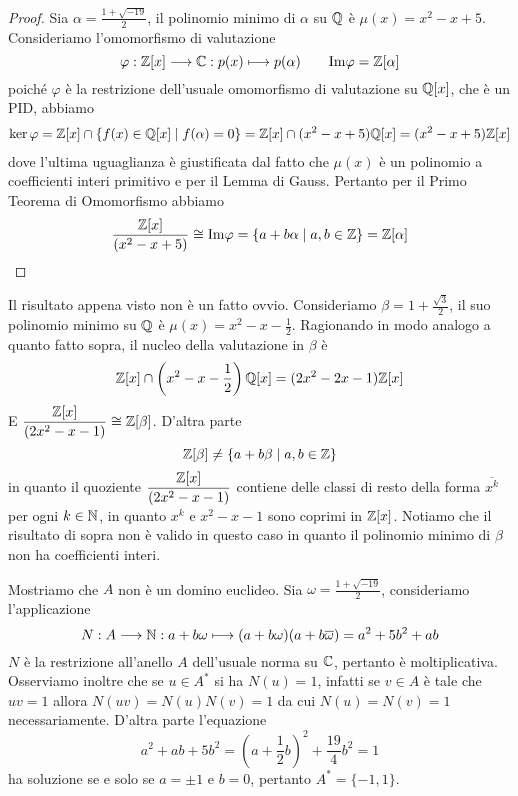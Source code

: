 \documentclass[11pt]{scrartcl}
\begin{document}
\begin{proof}
    Sia $\alpha = \displaystyle\frac{1 + \sqrt{-19}}{2}$, il polinomio minimo di $\alpha$
    su $\mathbb Q$ è $\mu(x) = x^2 - x + 5$. Consideriamo l'omomorfismo di valutazione
    \[
        \varphi: \mathbb Z[x]\longrightarrow \mathbb C: p(x) \longmapsto p(\alpha) 
        \qquad \mathrm{Im\varphi} = \mathbb Z[\alpha]
    \]
    poiché $\varphi$ è la restrizione dell'usuale omomorfismo di valutazione
    su $\mathbb Q[x]$, che è un PID, abbiamo
    \begin{multline*}
        \ker \varphi = \mathbb Z[x] \cap \{f(x) \in \mathbb Q[x]\mid f(\alpha) = 0\}
        = \mathbb Z[x] \cap (x^2 - x + 5)\mathbb Q[x] = (x^2 - x + 5)\mathbb Z[x]
    \end{multline*}
    dove l'ultima uguaglianza è giustificata dal fatto che $\mu(x)$ è un 
    polinomio a coefficienti interi primitivo e per il Lemma di Gauss.
    Pertanto per il Primo Teorema di Omomorfismo abbiamo 
    \[
        \frac{\mathbb Z[x]}{(x^2 - x + 5)} \cong \mathrm{Im\varphi} = 
        \{a + b\alpha \mid a, b \in \mathbb Z\} = \mathbb Z[\alpha]
    \]
\end{proof}

\begin{remark}
    Il risultato appena visto non è un fatto ovvio. Consideriamo $\beta = 
    \displaystyle 1 + \frac{\sqrt{3}}{2}$,
    il suo polinomio minimo su $\mathbb Q$ è $\displaystyle\mu(x) = x^2 - x - \frac 1 2$.
    Ragionando in modo analogo a quanto fatto sopra, il nucleo della valutazione
    in $\beta$ è 
    \[
        \mathbb Z[x] \cap \left(x^2 - x - \frac 1 2\right)\mathbb Q[x] =(2x^2 - 2x - 1)\mathbb Z[x]
    \]
    E $\displaystyle\frac{\mathbb Z[x]}{(2x^2 - x - 1)} \cong \mathbb Z[\beta]$.
    D'altra parte 
    \[
        \mathbb Z[\beta] \neq \{a + b\beta\mid a, b \in \mathbb Z\}
    \]
    in quanto il quoziente $\displaystyle\frac{\mathbb Z[x]}{(2x^2 - x - 1)}$
    contiene delle classi di resto della forma $\overline{x^k}$ per ogni $k \in \mathbb N$,
    in quanto $x^k$ e $x^2 - x - 1$ sono coprimi in $\mathbb Z[x]$. Notiamo che
    il risultato di sopra non è valido in questo caso in quanto il polinomio
    minimo di $\beta$ non ha coefficienti interi.
\end{remark}

Mostriamo che $A$ non è un domino euclideo. Sia $\omega = 
\displaystyle\frac{1 + \sqrt{-19}}{2}$, consideriamo l'applicazione
\[
    N: A \longrightarrow \mathbb N: a + b\omega \longmapsto (a + b\omega)(a + b\overline{\omega}) =
    a^2 + 5b^2 + ab
\]
$N$ è la restrizione all'anello $A$ dell'usuale norma su $\mathbb C$,
pertanto è moltiplicativa. Osserviamo inoltre che se $u \in A^*$ si ha 
$N(u)= 1$, infatti se $v \in A$ è tale che $uv = 1$ allora $N(uv) = N(u)N(v) = 1$
da cui $N(u) = N(v) = 1$ necessariamente. D'altra parte l'equazione 
\[
    a^2 + ab + 5b^2 = \left(a + \frac 1 2 b\right)^2 + \frac{19}{4} b^2 = 1
\]
ha soluzione se e solo se $a = \pm 1$ e $b = 0$, pertanto $A^* = \{-1, 1\}$.
\end{document}
